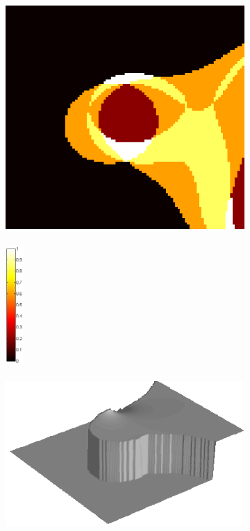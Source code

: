\documentclass[11pt]{article}
\begin{document}
\begin{figure}[!hbt]
  \begin{subfigure}[h]{0.3\textwidth}
    \centering
    \includegraphics[width = \textwidth]{../synth-images/albedo.png}
  \end{subfigure} 
  \begin{subfigure}[h]{0.02\linewidth}
    \centering
    \includegraphics[width = 7mm, height = 48mm]{../synth-images/colorbar.png}
  \end{subfigure} 
    \begin{subfigure}[h]{0.5\textwidth}
    \centering
    \includegraphics[width = \textwidth]{../synth-images/depthMap.png}
  \end{subfigure} 
   

\end{figure}
\end{document}
